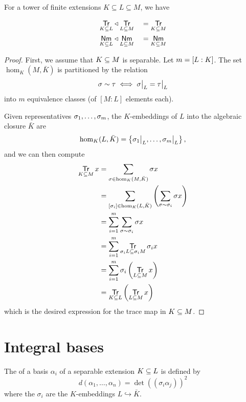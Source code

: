 \begin{theorem}{\label{mul-trace-norm}}
  For a tower of finite extensions $K \subseteq L \subseteq M$, we have

  \begin{alignat*}{2}
    \Trmg L K &\triangleleft \Trmg M L &&= \Trmg M K\\
    \Nmmg L K &\triangleleft \Nmmg M L &&= \Nmmg M K
  \end{alignat*}
\end{theorem}

\begin{proof}
  First, we assume that $\ringExtension M K$ is separable. Let $m =
  \fieldExtensionDegree L K$. The set $\hom_K(M,\bar K)$ is partitioned by the
  relation \[ \sigma \sim \tau \iff \restr{\sigma}{L} = \restr{\tau}{L} \] into
  $m$ equivalence classes (of $[M : L]$ elements each).

  \medskip\noindent
  Given representatives $\iseqi \sigma m$, the $K$-embeddings
  of $L$ into the algebraic closure $\bar K$ are \[\kembk L = \left\{
  \restr{\sigma_1}{L}, \ldots, \restr{\sigma_m}{L} \right\},\] and we can then
  compute
  \begin{align*}
    \Trmg M K x 
          &= \sum_{\sigma \in \kembk{M}} \sigma x \\ 
          &= \sum_{\left[\sigma_i\right] \in \kembk{L}} 
             \left(\sum_{\sigma \sim \sigma_i} \sigma x\right) \\
          &= \sum_{i = 1}^m \sum_{\sigma \sim \sigma_i} \sigma x \\
          &= \sum_{i = 1}^m \Trmg {\sigma_i M}{\sigma_i L} {\sigma_i x} \\
          &= \sum_{i = 1}^m \sigma_i \left(\Trmg M L x\right) \\
          &= \Trmg L K \left(\Trmg M L x\right)
   \end{align*}
   which is the desired expression for the trace map in $\ringExtension M K$.
\end{proof}

\section{Integral bases}

\begin{definition}
  The  of a basis $\alpha_i$ of a separable extension
  $\ringExtension L K$ is defined by
  \[ d(\alpha_1,\ldots,\alpha_n) = \det((\sigma_i\alpha_j))^2 \] where the
  $\sigma_i$ are the $K$-embeddings $L \hookrightarrow {\bar{K}}$.
\end{definition}

